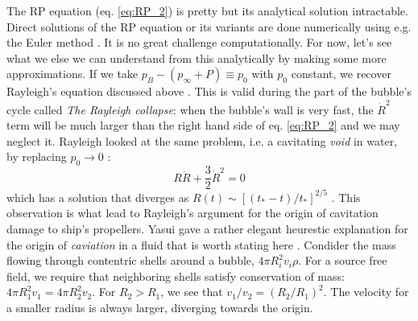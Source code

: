 \documentclass[rmp,aps,nofootinbib,superscriptaddress,floatfix,10pt]{revtex4-2}
\begin{document}
The RP equation (eq. \ref{eq:RP_2}) is pretty but its analytical solution intractable. Direct solutions of the RP equation or its variants are done numerically using e.g. the Euler method \cite{yasui2018acoustic,yasui2015dynamics}. It is no great challenge computationally. For now, let's see what we else we can understand from this analytically by making some more approximations. If we take $p_B-(p_\infty+P) \equiv p_0$ with $p_0$ constant, we recover Rayleigh's equation discussed above \cite{rayleigh1917pressure,plesset1949dynamics,prosperetti1999old,brenner2002single}. This is valid during the part of the bubble's cycle called \emph{The Rayleigh collapse}: when the bubble's wall is very fast, the $\dot{R}^2$ term will be much larger than the right hand side of eq. \ref{eq:RP_2} and we may neglect it. Rayleigh looked at the same problem, i.e. a cavitating \emph{void} in water, by replacing $p_0\rightarrow 0$ \cite{brenner2002single,rayleigh1917pressure}:
\begin{equation}
    R\ddot{R}+\frac{3}{2}\dot{R}^2=0
    \label{eq:Rayleigh}
\end{equation}
which has a solution that diverges as $R(t)\sim\left[(t_*-t)/t_* \right]^{2/5}$ \cite{brenner2002single}. This observation is what lead to Rayleigh's argument for the origin of cavitation damage to ship's propellers. Yasui gave a rather elegant heurestic explanation for the origin of \emph{caviation} in a fluid that is worth stating here \cite{yasui2018acoustic}. Condider the mass flowing through contentric shells around a bubble, $4\pi R_i^2 v_i \rho$. For a source free field, we require that neighboring shells satisfy conservation of mass: $4\pi R_1^2 v_1 = 4\pi R_2^2 v_2$. For $R_2 > R_1$, we see that $v_1/v_2 = \left(R_2/R_1\right)^2$. The velocity for a smaller radius is always larger, diverging towards the origin.
\end{document}
